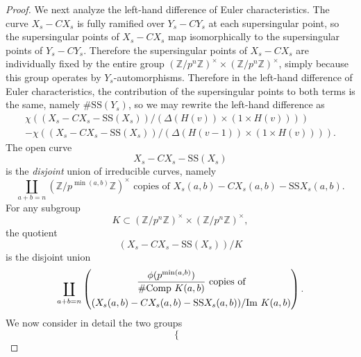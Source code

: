 \begin{proof}
We next analyze the left-hand difference of Euler characteristics. The curve $X_s - CX_s$ is fully ramified over $Y_s - CY_s$ at each supersingular point, so the supersingular points of $X_s - CX_s$ map isomorphically to the supersingular points of $Y_s - CY_s$. Therefore the supersingular points of $X_s - CX_s$ are individually fixed by the entire group $(\mathbb{Z}/p^n\mathbb{Z})^\times \times (\mathbb{Z}/p^n\mathbb{Z})^\times$, simply because this group operates by $Y_s$-automorphisms. Therefore in the left-hand difference of Euler characteristics, the contribution of the supersingular points to both terms is the same, namely $\#\mathrm{SS}(Y_s)$, so we may rewrite the left-hand difference as
\begin{multline}\label{eq:14.5.10.1}
\chi((X_s - CX_s - \mathrm{SS}(X_s)) / (\Delta(H(v)) \times (1 \times H(v)))) \\
- \chi((X_s - CX_s - \mathrm{SS}(X_s)) / (\Delta(H(v-1)) \times (1 \times H(v)))) .
\end{multline}
The open curve
\begin{equation}\label{eq:14.5.10.2}
X_s - CX_s - \mathrm{SS}(X_s)
\end{equation}
is the \emph{disjoint} union of irreducible curves, namely
\begin{equation}\label{eq:14.5.10.3}
\coprod_{a+b=n} (\mathbb{Z}/p^{\min(a,b)}\mathbb{Z})^\times \text{ copies of } X_s(a,b) - CX_s(a,b) - \mathrm{SS} X_s(a,b) .
\end{equation}
For any subgroup
\begin{equation}\label{eq:14.5.10.4}
K \subset (\mathbb{Z}/p^n\mathbb{Z})^\times \times (\mathbb{Z}/p^n\mathbb{Z})^\times ,
\end{equation}
the quotient
\begin{equation}\label{eq:14.5.10.5}
(X_s - CX_s - \mathrm{SS}(X_s))/K
\end{equation}
is the disjoint union
\begin{equation}\label{eq:14.5.10.6}
\coprod_{a+b=n} \left( \begin{array}{@{}c@{}} \displaystyle \frac{\phi(p^{\min(a,b)})}{\#\mathrm{Comp}\ K(a,b)} \text{ copies of} \\[10pt] (X_s(a,b) - CX_s(a,b) - \mathrm{SS} X_s(a,b)) / \mathrm{Im}\ K(a,b) \end{array} \right) .
\end{equation}
We now consider in detail the two groups
\begin{equation}\label{eq:14.5.10.7}
\begin{cases}

\end{cases}
\end{equation}
\end{proof}
